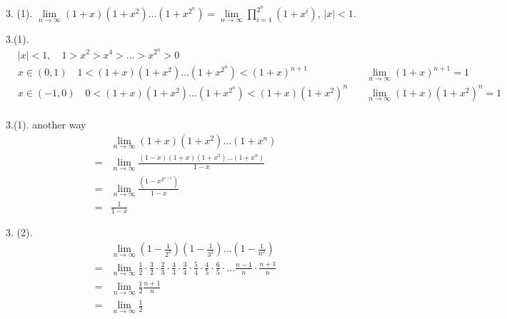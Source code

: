 3. (1).
$ \lim\limits_{n\rightarrow\infty}(1+x)(1+x^2)\dots(1+x^{2^n}) = \lim\limits_{n\rightarrow\infty}\prod_{i=1}^{2^n}(1+x^i) $, $ |x| <1 $.
\begin{solve}3.(1).
	\begin{align*}
		&|x|<1,\quad 1>x^2>x^4>\dots>x^{2^n}>0&\\
		&x\in(0,1)\quad 1<(1+x)(1+x^2)\dots(1+x^{2^n})<(1+x)^{n+1}\quad &\lim_{n\rightarrow\infty}(1+x)^{n+1}=1\\
		&x\in(-1,0)\quad 0<(1+x)(1+x^2)\dots(1+x^{2^n})<(1+x)(1+x^2)^{n}\quad &\lim_{n\rightarrow\infty}(1+x)(1+x^2)^{n}=1\\
	\end{align*}
\end{solve}
\begin{solve}3.(1). another way
	\begin{align*}
		 &\lim_{n\rightarrow\infty} (1+x)(1+x^2)\dots(1+x^n)\\
		=&\lim_{n\rightarrow\infty} \frac{(1-x)(1+x)(1+x^2)\dots(1+x^n)}{1-x}\\
		=&\lim_{n\rightarrow\infty} \frac{(1-x^{2^{n+1}})}{1-x}\\
		=&\frac{1}{1-x}
	\end{align*}
\end{solve}


\begin{solve}3. (2).
	\begin{align*}
		&\lim_{n\rightarrow\infty}(1-\frac{1}{2^2})(1-\frac{1}{3^2})\dots(1-\frac{1}{n^2})\\
		=&\lim_{n\rightarrow\infty}
		 \frac{1}{2}\cdot\frac{3}{2}\cdot
		 \frac{2}{3}\cdot\frac{4}{3}\cdot
		 \frac{3}{4}\cdot\frac{5}{4}\cdot
		 \frac{4}{5}\cdot\frac{6}{5}\cdot
		 \dots
		 \frac{n-1}{n}\cdot\frac{n+1}{n}\\
		=&\lim_{n\rightarrow\infty}\frac{1}{2}\frac{n+1}{n}\\
		=&\lim_{n\rightarrow\infty}\frac{1}{2}		 
	\end{align*}
\end{solve}


